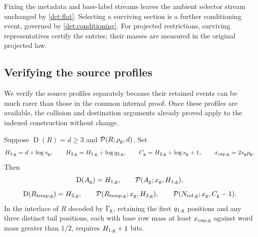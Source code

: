\documentclass[11pt]{article} \usepackage[utf8]{inputenc}
\theoremstyle{plain} \newtheorem{theorem}{Theorem}[section]
\theoremstyle{definition} \newaliascnt{definition}{theorem}
\newcommand{\D}{\operatorname{D}}
\newcommand{\RP}[3]{\mathcal{P}(#1;#2,#3)}
\begin{document}
Fixing the metadata and base-label streams leaves the ambient selector stream
unchanged by \cref{det:flat}. Selecting a surviving section is a further
conditioning event, governed by \cref{det:conditioning}. For projected
restrictions, surviving representatives certify the entries; their masses
are measured in the original projected law.

\subsection{Verifying the source profiles}

We verify the source profiles separately because their retained events can
be much rarer than those in the common internal proof. Once these profiles
are available, the collision and destination arguments already proved apply
to the indexed construction without change.

\begin{lemma}\label{det:profiles}
Suppose \(\D(R)=d\ge3\) and \(\RP{R}{\rho_{\rm g}}d\). Set
\[
H_{1,\rm g}=d+\log s_{\rm g},\qquad H_{2,\rm g}=H_{1,\rm g}+\log q_{2,\rm
g},\qquad C_{\rm g}=H_{2,\rm g}+\log s_{\rm g}+1,\qquad x_{\rm cap,g}=2s_{\rm
g}\rho_{\rm g}.
\]
Then
\[
\D(A_{\rm g})=H_{1,\rm g},\qquad \RP{A_{\rm g}}{x_{\rm g}}{H_{1,\rm g}},
\]
\[
\D(R_{\rm temp,g})=H_{2,\rm g},\qquad \RP{R_{\rm temp,g}}{x_{\rm g}}{H_{2,\rm
g}},\qquad \RP{N_{\rm ref,g}}{x_{\rm g}}{C_{\rm g}-1}.
\]
In the interlace of \(R\) decoded by \(\Gamma_{\rm g}\), retaining the first
\(q_{1,\rm g}\) positions and any three distinct tail positions, each with base
row mass at least \(x_{\rm cap,g}\) against word mass greater than \(1/2\),
requires \(H_{1,\rm g}+1\) bits.
\end{lemma}
\end{document}
